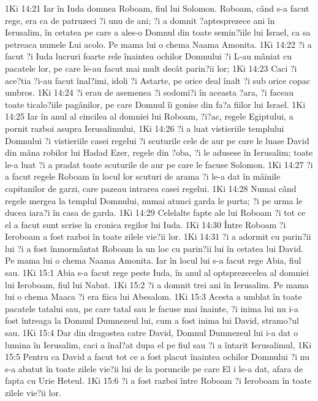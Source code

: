 1Ki 14:21  Iar în Iuda domnea Roboam, fiul lui Solomon. Roboam, când s-a facut rege, era ca de patruzeci ?i unu de ani; ?i a domnit ?aptesprezece ani în Ierusalim, în cetatea pe care a ales-o Domnul din toate semin?iile lui Israel, ca sa petreaca numele Lui acolo. Pe mama lui o chema Naama Amonita.
1Ki 14:22  ?i a facut ?i Iuda lucruri foarte rele înaintea ochilor Domnului ?i L-au mâniat cu pacatele lor, pe care le-au facut mai mult decât parin?ii lor;
1Ki 14:23  Caci ?i ace?tia ?i-au facut înal?imi, idoli ?i Astarte, pe orice deal înalt ?i sub orice copac umbros.
1Ki 14:24  ?i erau de asemenea ?i sodomi?i în aceasta ?ara, ?i faceau toate ticalo?iile pagânilor, pe care Domnul îi gonise din fa?a fiilor lui Israel.
1Ki 14:25  Iar în anul al cincilea al domniei lui Roboam, ?i?ac, regele Egiptului, a pornit razboi asupra Ierusalimului,
1Ki 14:26  ?i a luat vistieriile templului Domnului ?i vistieriile casei regelui ?i scuturile cele de aur pe care le luase David din mâna robilor lui Hadad Ezer, regele din ?oba, ?i le adusese în Ierusalim; toate le-a luat ?i a pradat toate scuturile de aur pe care le facuse Solomon.
1Ki 14:27  ?i a facut regele Roboam în locul lor scuturi de arama ?i le-a dat în mâinile capitanilor de garzi, care pazeau intrarea casei regelui.
1Ki 14:28  Numai când regele mergea la templul Domnului, numai atunci garda le purta; ?i pe urma le ducea iara?i în casa de garda.
1Ki 14:29  Celelalte fapte ale lui Roboam ?i tot ce el a facut sunt scrise în cronica regilor lui Iuda.
1Ki 14:30  Între Roboam ?i Ieroboam a fost razboi în toate zilele vie?ii lor.
1Ki 14:31  ?i a adormit cu parin?ii lui ?i a fost înmormântat Roboam la un loc cu parin?ii lui în cetatea lui David. Pe mama lui o chema Naama Amonita. Iar în locul lui s-a facut rege Abia, fiul sau.
1Ki 15:1  Abia s-a facut rege peste Iuda, în anul al optsprezecelea al domniei lui Ieroboam, fiul lui Nabat.
1Ki 15:2  ?i a domnit trei ani în Ierusalim. Pe mama lui o chema Maaca ?i era fiica lui Abesalom.
1Ki 15:3  Acesta a umblat în toate pacatele tatalui sau, pe care tatal sau le facuse mai înainte, ?i inima lui nu i-a fost întreaga la Domnul Dumnezeul lui, cum a fost inima lui David, stramo?ul sau.
1Ki 15:4  Dar din dragostea catre David, Domnul Dumnezeul lui i-a dat o lumina în Ierusalim, caci a înal?at dupa el pe fiul sau ?i a întarit Ierusalimul,
1Ki 15:5  Pentru ca David a facut tot ce a fost placut înaintea ochilor Domnului ?i nu s-a abatut în toate zilele vie?ii lui de la poruncile pe care El i le-a dat, afara de fapta cu Urie Heteul.
1Ki 15:6  ?i a fost razboi între Roboam ?i Ieroboam în toate zilele vie?ii lor.
